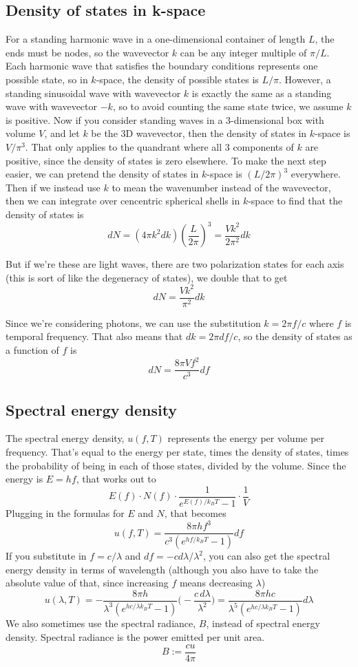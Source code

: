 \documentclass[12pt]{article}
\begin{document}
\subsection{Density of states in k-space}
For a standing harmonic wave in a one-dimensional container of length $L$, the ends must be nodes, so the wavevector $k$ can be any integer multiple of $\pi/L$. Each harmonic wave that satisfies the boundary conditions represents one possible state, so in $k$-space, the density of possible states is $L/\pi$. However, a standing sinusoidal wave with wavevector $k$ is exactly the same as a standing wave with wavevector $-k$, so to avoid counting the same state twice, we assume $k$ is positive. Now if you consider standing waves in a 3-dimensional box with volume $V$, and let $k$ be the 3D wavevector, then the density of states in $k$-space is $V/\pi^3$. That only applies to the quandrant where all 3 components of $k$ are positive, since the density of states is zero elsewhere. To make the next step easier, we can pretend the density of states in $k$-space is $(L/2\pi)^3$ everywhere. Then if we instead use $k$ to mean the wavenumber instead of the wavevector, then we can integrate over cencentric spherical shells in $k$-space to find that the density of states is
\[ dN = (4 \pi k^2 dk) \left( \frac{L}{2 \pi} \right)^3 = \frac{V k^2}{2 \pi^2} dk \]

But if we're these are light waves, there are two polarization states for each axis (this is sort of like the degeneracy of states), we double that to get
\[ dN = \frac{V k^2}{\pi^2} dk \]

Since we're considering photons, we can use the substitution $k = 2 \pi f / c$ where $f$ is temporal frequency. That also means that $dk = 2 \pi df / c$, so the density of states as a function of $f$ is
\[ dN = \frac{8 \pi V f^2}{c^3} df \]

\subsection{Spectral energy density}
The spectral energy density, $u(f, T)$ represents the energy per volume per frequency. That's equal to the energy per state, times the density of states, times the probability of being in each of those states, divided by the volume. Since the energy is $E = hf$, that works out to
\[E(f) \cdot N(f) \cdot \frac{1}{e^{E(f)/k_B T} - 1} \cdot \frac{1}{V} \]
Plugging in the formulas for $E$ and $N$, that becomes
\[u(f, T) = \frac{8 \pi h f^3}{c^3 (e^{hf/k_B T} - 1)} df\]
If you substitute in $f = c / \lambda$ and $df = - c d\lambda / \lambda^2$, you can also get the spectral energy density in terms of wavelength (although you also have to take the absolute value of that, since increasing $f$ means decreasing $\lambda$)
\[ u(\lambda, T) = - \frac{8 \pi h}{\lambda^3 (e^{h c / \lambda k_B T} - 1)} \Bigg( - \frac{c \, d\lambda}{\lambda^2} \Bigg) = \frac{8 \pi h c}{\lambda^5 (e^{h c / \lambda k_B T} - 1)} d\lambda \]
We also sometimes use the spectral radiance, $B$, instead of spectral energy density. Spectral radiance is the power emitted per unit area.
\[ B := \frac{c u}{4 \pi} \]
\end{document}
